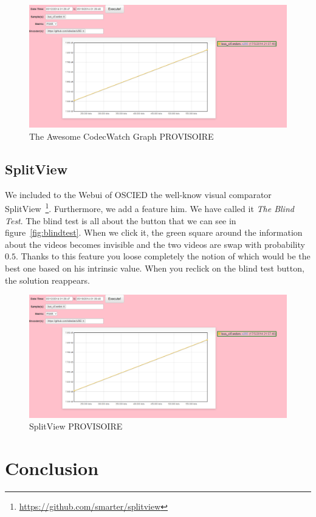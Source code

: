 \documentclass[a4paper,12pt]{article}
\begin{document}
\begin{figure}[!h]
	\centering
	\includegraphics[width=1\textwidth]{figures/graph1.png}
	\caption{The Awesome CodecWatch Graph PROVISOIRE}
	\label{fig:graph1}
\end{figure}

\subsection{SplitView}
We included to the Webui of OSCIED the well-know visual comparator SplitView~\footnote{\url{https://github.com/smarter/splitview}}. Furthermore, we add a feature him. We have called it \emph{The Blind Test}. The blind test is all about the button that we can see in figure~\ref{fig:blindtest}. When we click it, the green square around the information about the videos becomes invisible and the two videos are swap with probability $0.5$. Thanks to this feature you loose completely the notion of which would be the best one based on his intrinsic value. When you reclick on the blind test button, the solution reappears.

\begin{figure}[!h]
	\centering
	\includegraphics[width=1\textwidth]{figures/graph1.png}
	\caption{SplitView PROVISOIRE}
	\label{fig:graph1}
\end{figure}




\section{Conclusion}
\end{document}
